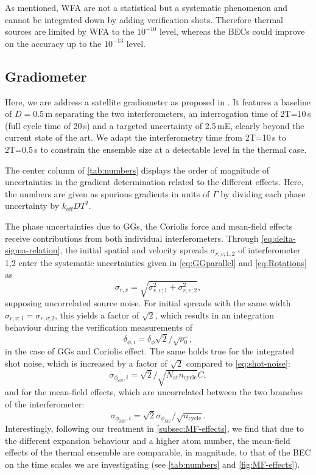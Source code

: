 As mentioned, WFA are not a statistical but a systematic phenomenon and cannot be integrated down by adding verification shots. Therefore thermal sources are limited by WFA to the $10^{-10}$ level, whereas
the BECs could improve on the accuracy up to the $10^{-13}$ level.

%
\subsection{Gradiometer}
Here, we are address a satellite gradiometer as proposed in \cite{Trimeche2019}. It features a baseline of $D=0.5$\,m separating the two interferometers, an interrogation time of 2T=10\,s (full cycle time of 20\,s) and a targeted uncertainty of 2.5\,mE, clearly beyond the current state of the art. We adapt the interferometry time from 2T=10\,s to 2T=0.5\,s to constrain the ensemble size at a detectable level in the thermal case.

The center column of \autoref{tab:numbers} displays the order of magnitude of uncertainties in the gradient determination related to the different effects. Here, the numbers are given as spurious gradients in units of $\Gamma$ by dividing each phase uncertainty by $k_\text{eff}DT^2$.

The phase uncertainties due to GGs, the Coriolis force and mean-field effects receive contributions from both individual interferometers. Through \autoref{eq:delta-sigma-relation}, the initial spatial and velocity spreads $\sigma_{r,v;1,2}$ of interferometer 1,2 enter the systematic uncertainties given in \autoref{eq:GGparallel} and \autoref{eq:Rotations} as 
\begin{equation}
    \label{eq:mean-square-spreads}
    \sigma_{r,v}=\sqrt{\sigma_{r,v;1}^2+\sigma_{r,v;2}^2},
\end{equation}
supposing uncorrelated source noise. For initial spreads with the same width $\sigma_{r,v;1}=\sigma_{r,v;2}$, this yields a factor of $\sqrt{2}$, which results in an integration behaviour during the verification measurements of
\begin{equation}
    \delta_{\phi,i}=\delta_{\phi}\sqrt{2}/\sqrt{\nu_0},
\end{equation}
in the case of GGs and Coriolis effect.
The same holds true for the integrated shot noise, which is increased by a factor of $\sqrt{2}$ compared to \autoref{eq:shot-noise}:
\begin{equation}
    \sigma_{\phi_\text{SN},i}=\sqrt{2}/\sqrt{N_\text{at} n_\text{cycle}}C,
\end{equation}
and for the mean-field effects, which are uncorrelated between the two branches of the interferometer:
\begin{equation}
    \sigma_{\phi_\text{MF},i}=\sqrt{2}\sigma_{\phi_\text{MF}}/\sqrt{n_\text{cycle}}.
\end{equation}
Interestingly, following our treatment in \autoref{subsec:MF-effects}, we find that due to the different expansion behaviour and a higher atom number, the mean-field effects of the thermal ensemble are comparable, in magnitude, to that of the BEC on the time scales we are investigating (see \autoref{tab:numbers} and \autoref{fig:MF-effects}).

